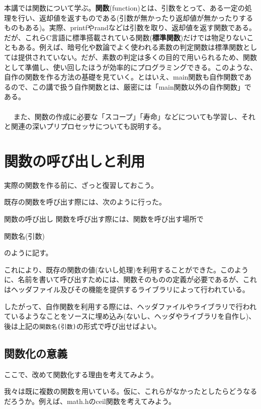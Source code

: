 本講では関数について学ぶ。\textbf{関数}(function)とは、引数をとって、ある一定の処理を行い、返却値を返すものである(引数が無かったり返却値が無かったりするものもある)。実際、printfやrandなどは引数を取り、返却値を返す関数である。だが、これらC言語に標準搭載されている関数(\textbf{標準関数})だけでは物足りないこともある。例えば、暗号化や数論でよく使われる素数の判定関数は標準関数としては提供されていない。だが、素数の判定は多くの目的で用いられるため、関数として準備し、使い回したほうが効率的にプログラミングできる。このような、自作の関数を作る方法の基礎を見ていく。とはいえ、main関数も自作関数であるので、この講で扱う自作関数とは、厳密には「main関数以外の自作関数」である。
\\ \\　
また、関数の作成に必要な「スコープ」「寿命」などについても学習し、それと関連の深いプリプロセッサについても説明する。

\section{関数の呼び出しと利用}
実際の関数を作る前に、ざっと復習しておこう。

既存の関数を呼び出す際には、次のように行った。
\begin{itembox}[l]{関数の呼び出し}
関数を呼び出す際には、関数を呼び出す場所で
\begin{code}
関数名(引数)
\end{code}
のように記す。
\end{itembox}

これにより、既存の関数の値(ないし処理)を利用することができた。このように、名前を書いて呼び出すためには、関数そのものの定義が必要であるが、これはヘッダファイル及びその機能を提供するライブラリによって行われている。

したがって、自作関数を利用する際には、ヘッダファイルやライブラリで行われているようなことをソースに埋め込み(ないし、ヘッダやライブラリを自作し)、後は上記の\verb|関数名(引数)|の形式で呼び出せばよい。

\subsection{関数化の意義}
ここで、改めて関数化する理由を考えてみよう。

我々は既に複数の関数を用いている。仮に、これらがなかったとしたらどうなるだろうか。例えば、math.hのceil関数を考えてみよう。

